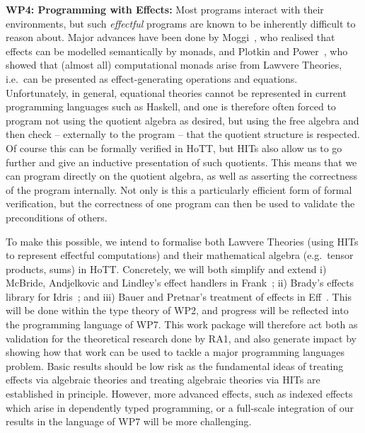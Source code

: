 \documentclass[a4paper,11pt]{article}
\begin{document}
{\bf WP4: Programming with Effects:}
Most programs interact with their environments,
but such \emph{effectful} programs are known to be inherently difficult to
reason about.
Major advances have been done by Moggi~\cite{moggi:monad}, who
realised that effects can be modelled semantically by monads, and
Plotkin and Power~\cite{PlotkinPower:Lawvere}, who showed that (almost
all) computational monads arise from Lawvere Theories, i.e.\ can be
presented as effect-generating operations and equations.
Unfortunately, in general, equational theories cannot be represented
in current programming languages such as Haskell, and one is therefore
often forced to program not using the quotient algebra as desired, but
using the free algebra and then check -- externally to the program --
that the quotient structure is respected.  Of course this can be
formally verified in HoTT, but HITs also allow us to go further and
give an inductive presentation of such quotients. This means that we
can program directly on the quotient algebra, as well as asserting the
correctness of the program %
internally.  Not only is this a particularly efficient form of formal
verification, but the correctness of one program can then be used to
validate the preconditions of others.

To make this possible, we intend to formalise both Lawvere Theories
(using HITs to represent effectful computations) and their
mathematical algebra (e.g.\ tensor products, sums) in HoTT.
Concretely, we will both simplify and extend i) McBride, Andjelkovic
and Lindley's effect handlers in Frank~\cite{conor:frank}; ii) Brady's
effects library for Idris~\cite{brady:effects}; and iii) Bauer and
Pretnar's treatment of effects in Eff~\cite{bauer:eff}.  This will be
done within the type theory of WP2, and progress will be reflected
into the programming language of WP7.  This work package will
therefore act both as validation for the theoretical research done by
RA1, and also generate impact by showing how that work can be used to
tackle a major programming languages problem. Basic results should be
low risk as the fundamental ideas of treating effects via algebraic
theories and treating algebraic theories via HITs are established in
principle. However, more advanced effects, such as indexed effects
which arise in dependently typed programming, or a full-scale
integration of our results in the language of WP7 will be more
challenging.
\end{document}
